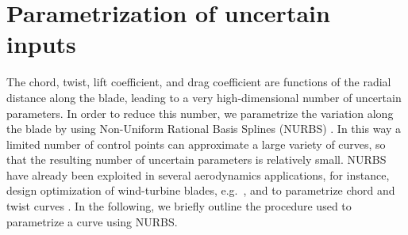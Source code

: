 
\section{Parametrization of uncertain inputs}\label{sec:parameterization}

The chord, twist, lift coefficient, and drag coefficient are functions of the radial distance along the blade, leading to a very high-dimensional number of uncertain parameters. In order to reduce this number, we parametrize the variation along the blade by using Non-Uniform Rational Basis Splines (NURBS) \cite{rogers2000}. In this way a limited number of control points can approximate a large variety of curves, so that the resulting number of uncertain parameters is relatively small. 
NURBS have already been exploited in several aerodynamics applications, for instance, design optimization of wind-turbine blades, e.g.~\cite{Bottasso2014,Ribeiro2012}, and to parametrize chord and twist curves \cite{Echeverria2017}. In the following, we briefly outline the procedure used to parametrize a curve using NURBS.


